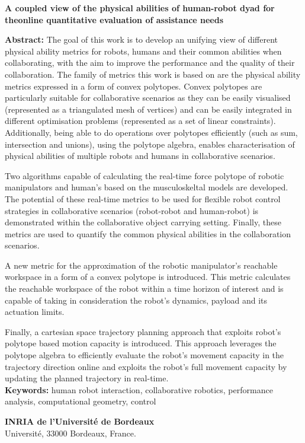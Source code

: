 \documentclass[french,12pt,a4paper]{report}
\begin{document}
\begin{small}
\begin{center}
\textbf{A coupled view of the physical abilities of human-robot dyad for theonline quantitative evaluation of assistance needs}
\end{center}
\textbf{Abstract:} 
The goal of this work is to develop an unifying view of different physical ability metrics for robots, humans and their common abilities when collaborating, with the aim to improve the performance and the quality of their collaboration. The family of metrics this work is based on are the physical ability metrics expressed in a form of convex polytopes. Convex polytopes are particularly suitable for collaborative scenarios as they can be easily visualised (represented as a triangulated mesh of vertices) and can be easily integrated in different optimisation problems (represented as a set of linear constraints). Additionally, being able to do operations over polytopes efficiently (such as sum, intersection and unions), using the polytope algebra, enables characterisation of physical abilities of multiple robots and humans in collaborative scenarios.

Two algorithms capable of calculating the real-time force polytope of robotic manipulators and human's based on the musculoskeltal models are developed. The potential of these real-time metrics to be used for flexible robot control strategies in collaborative scenarios (robot-robot and human-robot) is demonstrated within the collaborative object carrying setting. Finally, these metrics are used to quantify the common physical abilities in the collaboration scenarios. 

A new metric for the approximation of the robotic manipulator's reachable workspace in a form of a convex polytope is introduced. This metric calculates the reachable workspace of the robot within a time horizon of interest and is capable of taking in consideration the robot's dynamics, payload and its actuation limits. 

Finally, a cartesian space trajectory planning approach that exploits robot's polytope based motion capacity is introduced. This approach leverages the polytope algebra to efficiently evaluate the robot's movement capacity in the trajectory direction online and exploits the robot's full movement capacity by updating the planned trajectory in real-time.\\
\textbf{Keywords:} human robot interaction, collaborative robotics, performance analysis, computational geometry, control \\
\noindent\makebox[\linewidth]{\rule{\textwidth}{0.4pt}}

\vfill
{}
\begin{center}
    \textbf{INRIA de l'Université de Bordeaux}\\
Université, 33000 Bordeaux, France.
\end{center}
\end{small}
\vfill
\end{document}
